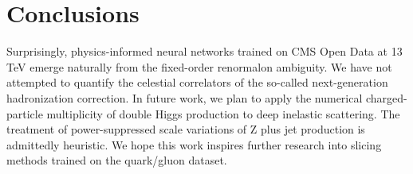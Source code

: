 \section{Conclusions}\label{sec:conclusions}

Surprisingly, physics-informed neural networks trained on CMS Open Data
at 13 TeV emerge naturally from the fixed-order renormalon ambiguity. We
have not attempted to quantify the celestial correlators of the
so-called next-generation hadronization correction. In future work, we
plan to apply the numerical charged-particle multiplicity of double
Higgs production to deep inelastic scattering. The treatment of
power-suppressed scale variations of Z plus jet production is admittedly
heuristic. We hope this work inspires further research into slicing
methods trained on the quark/gluon dataset.

